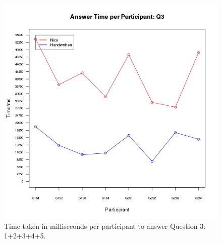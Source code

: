 \documentclass[12pt,twoside,notitlepage,xetex]{report}
\begin{document}
\begin{center}
\begin{figure}[H]
\begin{center}
\includegraphics[width=\textwidth-2cm]{figs/graphs/q3.png}
\end{center}
\caption{Time taken in milliseconds per participant to answer Question 3: 1+2+3+4+5.}
\label{fig:PlotQ3}
\end{figure}
\end{center}
\end{document}
